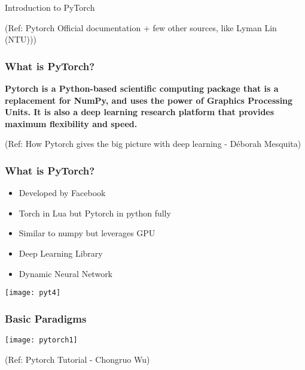 \begin{frame}
  \begin{center}
    {\Large Introduction to PyTorch}
    
\tiny{(Ref: Pytorch Official documentation + few other sources, like Lyman Lin (NTU)))}
  \end{center}
\end{frame}

\begin{frame}[fragile] \frametitle{What is PyTorch?}
  \begin{center}

{\bf Pytorch is a Python-based scientific computing package that is a replacement for NumPy, and uses the power of Graphics Processing Units. It is also a deep learning research platform that provides maximum flexibility and speed.}

  \end{center}

  {\tiny (Ref: How Pytorch gives the big picture with deep learning - Déborah Mesquita)}
\end{frame}

\begin{frame}[fragile] \frametitle{What is PyTorch?}
\begin{itemize}
\item Developed by Facebook
\item Torch in Lua but Pytorch in python fully
\item Similar to numpy but leverages GPU
\item Deep Learning Library
\item Dynamic Neural Network
\end{itemize}
\begin{center}
\texttt{[image: pyt4]}
\end{center}
\end{frame}

\begin{frame}[fragile] \frametitle{Basic Paradigms}


\begin{center}
\texttt{[image: pytorch1]}
\end{center}

  {\tiny (Ref: Pytorch Tutorial - Chongruo Wu)}

\end{frame}

